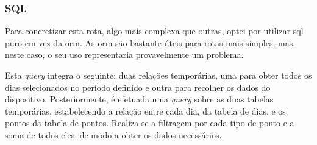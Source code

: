 \subsubsection{\textbf{SQL}}
Para concretizar esta rota, algo mais complexa que outras, optei por utilizar \acs{sql} puro em vez da \acs{orm}. As \acs{orm} são bastante úteis para rotas mais simples, mas, neste caso, o seu uso representaria provavelmente um problema.

Esta \textit{query} integra o seguinte: duas relações temporárias, uma para obter todos os dias selecionados no período definido e outra para recolher os dados do dispositivo. Posteriormente, é efetuada uma \textit{query} sobre as duas tabelas temporárias, estabelecendo a relação entre cada dia, da tabela de dias, e os pontos da tabela de pontos. Realiza-se a filtragem por cada tipo de ponto e a soma de todos eles, de modo a obter os dados necessários.

